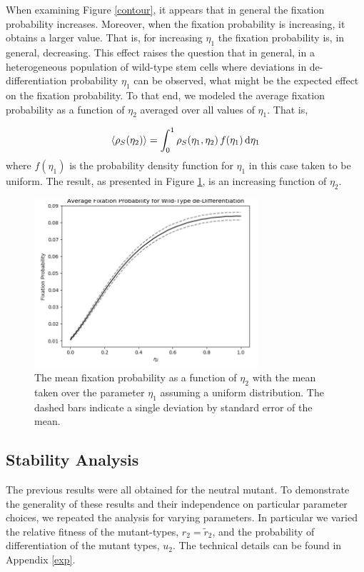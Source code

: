 \documentclass[12pt]{article}
\renewcommand{\d}{{\rm d}}
\begin{document}
When examining Figure \ref{contour}, it appears that in general the fixation probability increases. Moreover, when the fixation probability is increasing, it obtains a larger value. That is, for increasing $\eta_1$ the fixation probability is, in general, decreasing. This effect raises the question that in general, in a heterogeneous population of wild-type stem cells where deviations in de-differentiation probability $\eta_1$ can be observed, what might be the expected effect on the fixation probability. To that end, we modeled the average fixation probability as a function of $\eta_2$ averaged over all values of $\eta_1$. That is,

\[\langle\rho_S(\eta_2)\rangle = \int_0^1 \rho_S(\eta_1, \eta_2)\,f(\eta_1)\,\d \eta_1\]
where $f(\eta_1)$ is the probability density function for $\eta_1$ in this case taken to be uniform. The result, as presented in Figure \ref{avg_eta1_plot}, is an increasing function of $\eta_2$.

\begin{figure}[H]
\begin{center}
\includegraphics[width=0.74\textwidth]{avg_eta1_plot.png}
\end{center}
\caption{The mean fixation probability as a function of $\eta_2$ with the mean taken over the parameter $\eta_1$ assuming a uniform distribution. The dashed bars indicate a single deviation by standard error of the mean.}\label{avg_eta1_plot}
\end{figure}

\subsection{Stability Analysis}\label{stab}

The previous results were all obtained for the neutral mutant. To demonstrate the generality of these results and their independence on particular parameter choices, we repeated the analysis for varying parameters. In particular we varied the relative fitness of the mutant-types, $r_2=\tilde{r}_2$, and the probability of differentiation of the mutant types, $u_2$. The technical details can be found in Appendix \ref{exp}.
\end{document}
